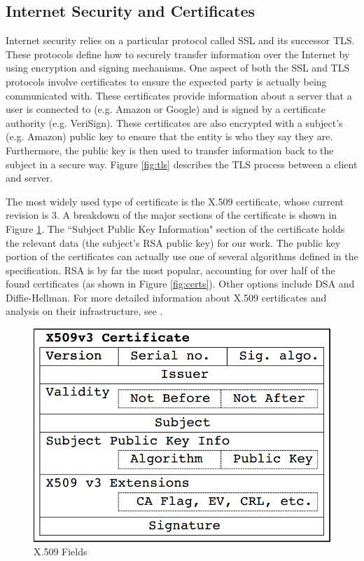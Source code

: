 \documentclass[12pt]{ucthesis}
\begin{document}
\subsection{Internet Security and Certificates}
Internet security relies on a particular protocol called SSL and its successor
TLS. These protocols define how to securely transfer information over the
Internet by using encryption and signing mechanisms. One aspect of both the SSL
and TLS protocols involve certificates to ensure the expected party is
actually being communicated with. These certificates provide information
about a server that a user is connected to (e.g. Amazon or Google)
and is signed by a certificate authority (e.g. VeriSign). These certificates
are also encrypted with a subject's (e.g. Amazon) public key to ensure that
the entity is who they say they are. Furthermore, the public key is then used 
to transfer information back to the subject in a secure way. Figure
\ref{fig:tls} describes the TLS process between a client and server. 

The most widely used type of certificate is the X.509 certificate, whose current
revision is 3. A breakdown of the major sections of the certificate is shown in
Figure \ref{fig:x509}. The ``Subject Public Key Information" section of the
certificate holds the relevant data (the subject's RSA public key) for our work.
The public key portion of the certificates can actually use one of several
algorithms defined in the specification. RSA is by far the most popular,
accounting for over half of the found certificates (as shown in Figure
\ref{fig:certs}). Other options include DSA and Diffie-Hellman. For more
detailed information about X.509 certificates and analysis on their
infrastructure, see \cite{holz2011ssl}.

\begin{figure}
   \centering
   \includegraphics[width=0.5\linewidth]{x509.png}
   \caption{X.509 Fields\cite{holz2011ssl}}
   \label{fig:x509}
\end{figure}
\end{document}
